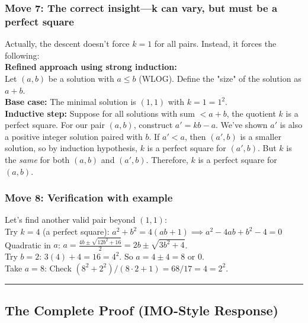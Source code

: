 \documentclass{article}
\begin{document}
\subsubsection*{Move 7: The correct insight—k can vary, but must be a perfect square}
Actually, the descent doesn't force $k = 1$ for all pairs. Instead, it forces the following: \\
\textbf{Refined approach using strong induction:} \\
Let $(a, b)$ be a solution with $a \leq b$ (WLOG). Define the "size" of the solution as $a + b$. \\
\textbf{Base case:} The minimal solution is $(1, 1)$ with $k = 1 = 1^2$. \\
\textbf{Inductive step:} Suppose for all solutions with sum $< a + b$, the quotient $k$ is a perfect square. For our pair $(a, b)$, construct $a' = kb - a$. We've shown $a'$ is also a positive integer solution paired with $b$. If $a' < a$, then $(a', b)$ is a smaller solution, so by induction hypothesis, $k$ is a perfect square for $(a', b)$. But $k$ is the \textit{same} for both $(a, b)$ and $(a', b)$. Therefore, $k$ is a perfect square for $(a, b)$. \\

\subsubsection*{Move 8: Verification with example}
Let's find another valid pair beyond $(1,1)$: \\
Try $k = 4$ (a perfect square): $a^2 + b^2 = 4(ab + 1) \implies a^2 - 4ab + b^2 - 4 = 0$ \\
Quadratic in $a$: $a = \frac{4b \pm \sqrt{12b^2 + 16}}{2} = 2b \pm \sqrt{3b^2 + 4}$. \\
Try $b = 2$: $3(4) + 4 = 16 = 4^2$. So $a = 4 \pm 4 = 8$ or $0$. \\
Take $a = 8$: Check $(8^2 + 2^2)/(8 \cdot 2 + 1) = 68/17 = 4 = 2^2$. \checkmark \\

\noindent \rule{\textwidth}{0.4pt}

\subsection*{The Complete Proof (IMO-Style Response)}
\end{document}

